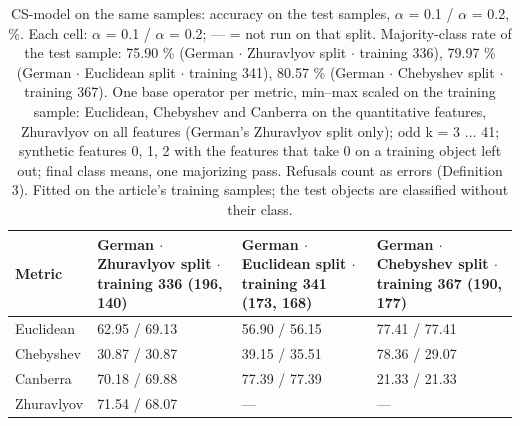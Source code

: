 \begin{table}[htbp]
  \centering
  \caption{CS-model on the same samples: accuracy on the test samples, $\alpha$ = 0.1 / $\alpha$ = 0.2, \%. Each cell: $\alpha$ = 0.1 / $\alpha$ = 0.2; --- = not run on that split. Majority-class rate of the test sample: 75.90 \% (German $\cdot$ Zhuravlyov split $\cdot$ training 336), 79.97 \% (German $\cdot$ Euclidean split $\cdot$ training 341), 80.57 \% (German $\cdot$ Chebyshev split $\cdot$ training 367). One base operator per metric, min--max scaled on the training sample: Euclidean, Chebyshev and Canberra on the quantitative features, Zhuravlyov on all features (German's Zhuravlyov split only); odd k = 3 $\ldots$ 41; synthetic features 0, 1, 2 with the features that take 0 on a training object left out; final class means, one majorizing pass. Refusals count as errors (Definition 3). Fitted on the article's training samples; the test objects are classified without their class.}
  \label{tab:cs-model}
  \begin{tabular}{llll}
    \toprule
    Metric & German $\cdot$ Zhuravlyov split $\cdot$ training 336 (196, 140) & German $\cdot$ Euclidean split $\cdot$ training 341 (173, 168) & German $\cdot$ Chebyshev split $\cdot$ training 367 (190, 177) \\
    \midrule
    Euclidean & 62.95 / 69.13 & 56.90 / 56.15 & 77.41 / 77.41 \\
    Chebyshev & 30.87 / 30.87 & 39.15 / 35.51 & 78.36 / 29.07 \\
    Canberra & 70.18 / 69.88 & 77.39 / 77.39 & 21.33 / 21.33 \\
    Zhuravlyov & 71.54 / 68.07 & --- & --- \\
    \bottomrule
  \end{tabular}
\end{table}
